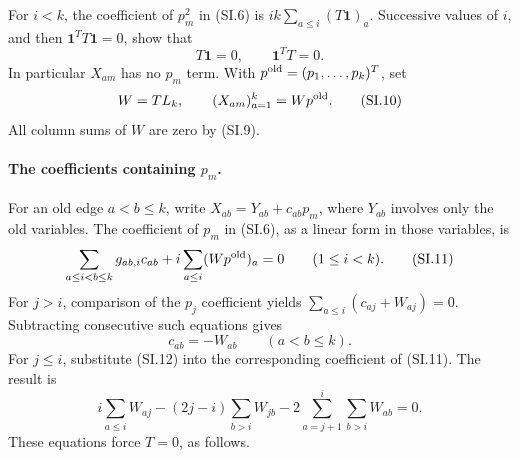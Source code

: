 For \(i<k\), the coefficient of \(p_m^2\) in (SI.6) is
\(ik\sum_{a\leq i}(T\mathbf1)_a\).
Successive values of \(i\), and then
\(\mathbf1^T T\mathbf1=0\), show that
\[
                     T\mathbf1=0,
                     \qquad\mathbf1^T T=0.
                                                               \tag{SI.9}
\]
In particular \(X_{am}\) has no \(p_m\) term. With
\(p^{\rm old}=(p_1,\ldots,p_k)^T\), set
\[
                  W=T L_k,\qquad
                  (X_{am})_{a=1}^k=W p^{\rm old}.
                                                               \tag{SI.10}
\]
All column sums of \(W\) are zero by (SI.9).

\paragraph{The coefficients containing \(p_m\).}
For an old edge \(a<b\leq k\), write
\(X_{ab}=Y_{ab}+c_{ab}p_m\), where \(Y_{ab}\) involves
only the old variables. The coefficient of \(p_m\) in
(SI.6), as a linear form in those variables, is
\[
 \sum_{a\leq i<b\leq k}g_{ab,i}c_{ab}
                  +i\sum_{a\leq i}(Wp^{\rm old})_a=0
                          \qquad(1\leq i<k).
                                                               \tag{SI.11}
\]
For \(j>i\), comparison of the \(p_j\) coefficient yields
\(\sum_{a\leq i}(c_{aj}+W_{aj})=0\).
Subtracting consecutive such equations gives
\[
                         c_{ab}=-W_{ab}\qquad(a<b\leq k).
                                                               \tag{SI.12}
\]
For \(j\leq i\), substitute (SI.12) into the corresponding
coefficient of (SI.11). The result is
\[
 i\sum_{a\leq i}W_{aj}
 -(2j-i)\sum_{b>i}W_{jb}
 -2\sum_{a=j+1}^i\sum_{b>i}W_{ab}=0.
                                                               \tag{SI.13}
\]
These equations force \(T=0\), as follows.

